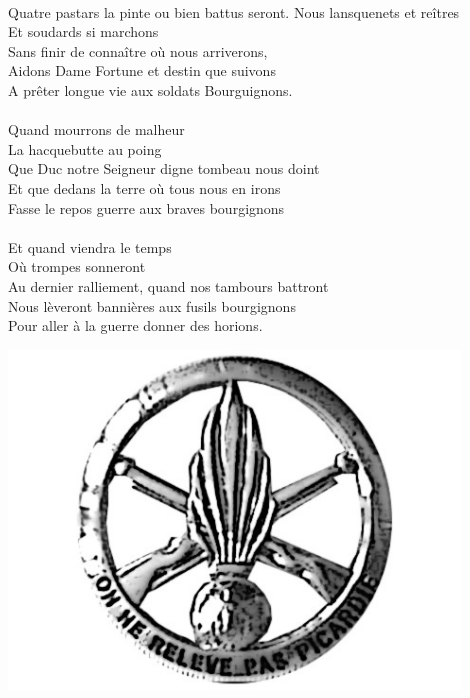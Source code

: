\\Quatre pastars la pinte ou bien battus seront.
\breakpage
Nous lansquenets et reîtres
\\Et soudards si marchons
\\Sans finir de connaître où nous arriverons,
\\Aidons Dame Fortune et destin que suivons
\\A prêter longue vie aux soldats Bourguignons.
\\\\Quand mourrons de malheur
\\La hacquebutte au poing
\\Que Duc notre Seigneur digne tombeau nous doint
\\Et que dedans la terre où tous nous en irons
\\Fasse le repos guerre aux braves bourgignons
\\\\Et quand viendra le temps
\\Où trompes sonneront
\\Au dernier ralliement, quand nos tambours battront
\\Nous lèveront bannières aux fusils bourgignons
\\Pour aller à la guerre donner des horions.
\\
\bigskip
\begin{center}
\includegraphics[width=0.9\textwidth]{images/picard.jpg}
\end{center}

\breakpage